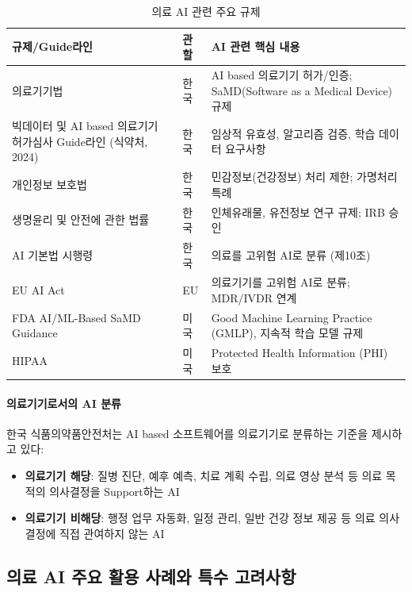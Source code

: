 \begin{table}[htbp]
\centering
\caption{의료 AI 관련 주요 규제}
\label{tab:healthcare_regulations}
\begin{tabularx}{\textwidth}{p{3.5cm}p{2.5cm}X}
\toprule
\textbf{규제/Guide라인} & \textbf{관할} & \textbf{AI 관련 핵심 내용} \\
\midrule
의료기기법 & 
한국 & 
AI based 의료기기 허가/인증; SaMD(Software as a Medical Device) 규제 \\
\midrule
빅데이터 및 AI based 의료기기 허가심사 Guide라인 (식약처, 2024) & 
한국 & 
임상적 유효성, 알고리즘 검증, 학습 데이터 요구사항 \\
\midrule
개인정보 보호법 & 
한국 & 
민감정보(건강정보) 처리 제한; 가명처리 특례 \\
\midrule
생명윤리 및 안전에 관한 법률 & 
한국 & 
인체유래물, 유전정보 연구 규제; IRB 승인 \\
\midrule
AI 기본법 시행령 & 
한국 & 
의료를 고위험 AI로 분류 (제10조) \\
\midrule
EU AI Act & 
EU & 
의료기기를 고위험 AI로 분류; MDR/IVDR 연계 \\
\midrule
FDA AI/ML-Based SaMD Guidance & 
미국 & 
Good Machine Learning Practice (GMLP), 지속적 학습 모델 규제 \\
\midrule
HIPAA & 
미국 & 
Protected Health Information (PHI) 보호 \\
\bottomrule
\end{tabularx}
\end{table}


\paragraph{의료기기로서의 AI 분류}

한국 식품의약품안전처는 AI based 소프트웨어를 
의료기기로 분류하는 기준을 제시하고 있다:

\begin{itemize}
 \item \textbf{의료기기 해당}: 
 질병 진단, 예후 예측, 치료 계획 수립, 의료 영상 분석 등 
 의료 목적의 의사결정을 Support하는 AI
 
 \item \textbf{의료기기 비해당}: 
 행정 업무 자동화, 일정 관리, 일반 건강 정보 제공 등 
 의료 의사결정에 직접 관여하지 않는 AI
\end{itemize}


\subsection{의료 AI 주요 활용 사례와 특수 고려사항}
\label{sec:5.2.2}


